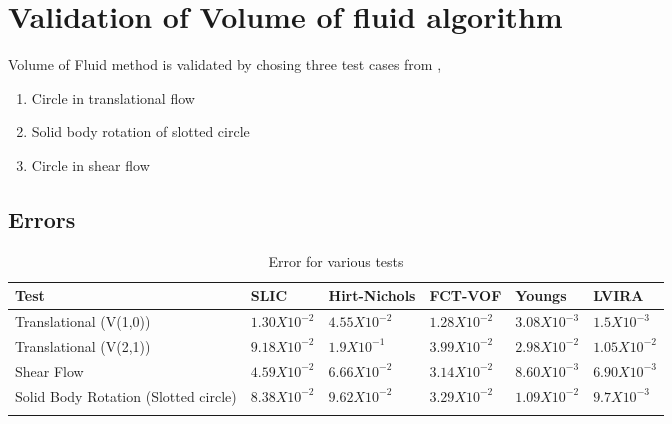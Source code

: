 
\chapter{Validation of Volume of fluid algorithm}
Volume of Fluid method is validated by chosing three test cases from \cite{Rudman1997}, 
\begin{enumerate}
 \item Circle in translational flow
 \item Solid body rotation of slotted circle
 \item Circle in shear flow
\end{enumerate}



\section{Errors}
\begin{table}[tbp]
  \begin{center}
    \caption{Error for various tests}
    \label{tab:samtab}
    \begin{tabular}{p{3cm}lllll}
      \toprule 
       Test & SLIC & Hirt-Nichols & FCT-VOF & Youngs & LVIRA  \\ 
      \midrule
      Translational (V(1,0)) & $1.30 X 10^{-2}$ & $4.55 X 10^{-2}$ & $1.28 X 10^{-2}$ & $3.08 X 10^{-3}$ & $1.5 X 10^{-3}$  \\ 
        Translational (V(2,1)) & $9.18 X 10^{-2}$ & $1.9 X 10^{-1}$ & $3.99 X 10^{-2}$ & $2.98 X 10^{-2}$ & $1.05 X 10^{-2}$  \\ 
      Shear Flow & $4.59 X 10^{-2}$ & $6.66 X 10^{-2}$ & $3.14 X 10^{-2}$ & $8.60 X 10^{-3}$ & $6.90 X 10^{-3}$  \\ 
       Solid Body Rotation (Slotted circle) & $8.38 X 10^{-2}$ & $9.62 X 10^{-2}$ & $3.29 X 10^{-2}$ & $1.09 X 10^{-2}$ & $9.7 X 10^{-3}$  \\ 
        
      \bottomrule \\
    \end{tabular}
  \end{center}
\end{table}





